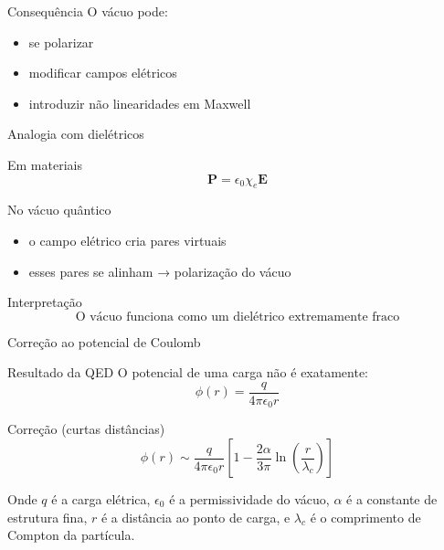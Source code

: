 \documentclass[aspectratio=169]{beamer}
\begin{document}
\begin{frame}[plain]

\begin{block}{Consequência}
O vácuo pode:
\begin{itemize}
\item se polarizar
\item modificar campos elétricos
\item introduzir não linearidades em Maxwell
\end{itemize}
\end{block}

\end{frame}


\begin{frame}{Analogia com dielétricos}

\begin{block}{Em materiais}
\[
\mathbf{P} = \epsilon_0 \chi_e \mathbf{E}
\]
\end{block}

\pause

\begin{block}{No vácuo quântico}
\begin{itemize}
\item o campo elétrico cria pares virtuais
\item esses pares se alinham → polarização do vácuo
\end{itemize}
\end{block}

\pause

\begin{alertblock}{Interpretação}
\[
\text{O vácuo funciona como um dielétrico extremamente fraco}
\]
\end{alertblock}

\end{frame}


\begin{frame}{Correção ao potencial de Coulomb}

\begin{block}{Resultado da QED}
O potencial de uma carga não é exatamente:
\[
\phi(r) = \frac{q}{4\pi\epsilon_0 r}
\]
\end{block}

\pause

\begin{block}{Correção (curtas distâncias)}
\begin{equation}
\phi(r)
\sim
\frac{q}{4\pi\epsilon_0 r}
\left[
1 - \frac{2\alpha}{3\pi}\ln\left(\frac{r}{\lambda_c}\right)
\right]
\end{equation}
\end{block}

\small
Onde \(q\) é a carga elétrica, \(\epsilon_0\) é a permissividade do vácuo,
\(\alpha\) é a constante de estrutura fina, \(r\) é a distância ao ponto de
carga, e \(\lambda_c\) é o comprimento de Compton da partícula.


\end{frame}
\end{document}
